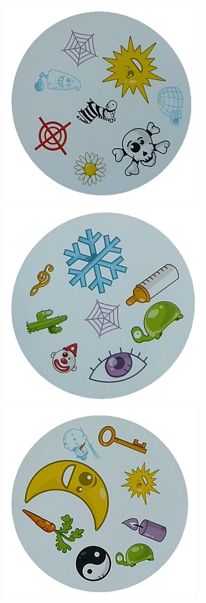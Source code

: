 \documentclass[10pt,a4paper]{article}
\begin{document}
\begin{center}
\includegraphics[scale=0.25]{2.1/card0.jpg}
\includegraphics[scale=0.25]{2.1/card1.jpg}
\includegraphics[scale=0.25]{2.1/card2.jpg}

\end{center}
\end{document}
